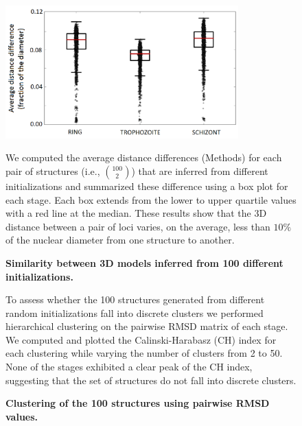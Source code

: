 \begin{figure}
  \begin{center}
  \includegraphics[width=0.8\textwidth]{suppFigs/stabilityOf3Dinference/compareStructurePairs.png}
   \end{center}
\caption{{\bf Similarity between 3D models inferred from 100 different initializations.}}
{We computed the average distance differences (Methods) for each pair of structures
(i.e., ${100 \choose 2}$) that are inferred from different initializations and
summarized these difference using a box plot for each stage. Each box extends from the
lower to upper quartile values with a red line at the median. These results show that
the 3D distance between a pair of loci varies, on the average, less than $10\%$ of the
nuclear diameter from one structure to another.
}
\label{suppfig:compareStructurePairs}
\end{figure}
\clearpage

\begin{figure}
  \begin{center}
   \hspace{0.15\textwidth}
  \hspace{0.15\textwidth}
   \end{center}
\caption{{\bf Clustering of the 100 structures using pairwise RMSD values.}}
{ To assess whether the 100 structures generated from different random initializations fall into 
discrete clusters we performed hierarchical clustering on the pairwise RMSD matrix of each 
stage. We computed and plotted the Calinski-Harabasz (CH) 
index \cite{calinski:dendrite} for each clustering while varying the number of clusters from 2 to 50. 
None of the stages exhibited a clear peak of the CH index, suggesting that the set of structures do not fall into discrete clusters.
}
\label{suppfig:CHindices}
\end{figure}
\clearpage


